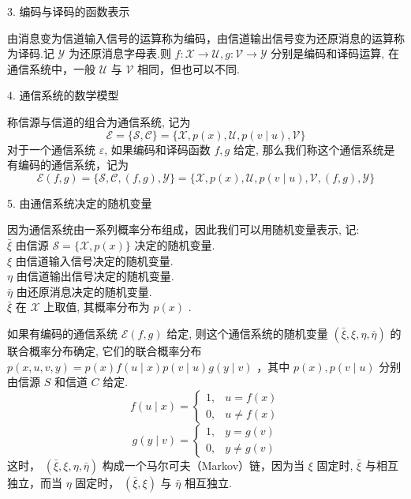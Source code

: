 3. 编码与译码的函数表示
\begin{definition}
    由消息变为信道输入信号的运算称为编码，由信道输出信号变为还原消息的运算称为译码.记 $ \mathscr{Y} $ 为还原消息字母表.则 $ f: \mathscr{X} \rightarrow \mathscr{U}, g: \mathscr{V} \rightarrow \mathscr{Y} $ 分别是编码和译码运算, 在通信系统中，一般 $ \mathscr{U} $ 与 $ \mathscr{V} $ 相同，但也可以不同.
\end{definition}

4. 通信系统的数学模型
\begin{definition}
    称信源与信道的组合为通信系统, 记为
$$
\mathscr{E}=\{\mathscr{S}, \mathscr{C}\}=\{\mathscr{X}, p(x), \mathscr{U}, p(v \mid u), \mathscr{V}\}
$$
对于一个通信系统 $ \varepsilon $, 如果编码和译码函数 $ f, g $ 给定, 那么我们称这个通信系统是有编码的通信系统，记为
$$
\mathscr{E}(f, g)=\{\mathscr{S}, \mathscr{C},(f, g), \mathscr{Y}\}=\{\mathscr{X}, p(x), \mathscr{U}, p(v \mid u), \mathscr{V},(f, g), \mathscr{Y}\}
$$
\end{definition}


5. 由通信系统决定的随机变量

因为通信系统由一系列概率分布组成，因此我们可以用随机变量表示, 记:\\
$ \bar{\xi} $ 由信源 $ \mathscr{S}=\{\mathscr{X}, p(x)\} $ 决定的随机变量.\\
$ \xi $ 由信道输入信号决定的随机变量.\\
$ \eta $ 由信道输出信号决定的随机变量.\\
$ \bar{\eta} $ 由还原消息决定的随机变量.\\
$ \bar{\xi} $ 在 $ \mathscr{X} $ 上取值, 其概率分布为 $ p(x) $ .

\begin{theorem}
    如果有编码的通信系统 $ \mathscr{E}(f, g) $ 给定, 则这个通信系统的随机变量 $ (\bar{\xi}, \xi, \eta, \bar{\eta}) $ 的联合概率分布确定, 它们的联合概率分布 $ p(x, u, v, y)=p(x) f(u \mid x) p(v \mid u) g(y \mid v) $ ，其中 $ p(x), p(v \mid u) $ 分别由信源 $ S $ 和信道 $ C $ 给定.
$$
f(u \mid x)=\left\{\begin{array}{ll}
1, & u=f(x) \\
0, & u \neq f(x)
\end{array}\right.
$$
$$
g(y \mid v)=\left\{\begin{array}{ll}
1, & y=g(v) \\
0, & y \neq g(v)
\end{array}\right.
$$
这时， $ (\bar{\xi}, \xi, \eta, \bar{\eta}) $ 构成一个马尔可夫（Markov）链，因为当 $ \xi $ 固定时, $ \bar{\xi} $ 与相互独立，而当 $ \eta $ 固定时， $ (\bar{\xi}, \xi) $ 与 $ \bar{\eta} $ 相互独立.
\end{theorem}

